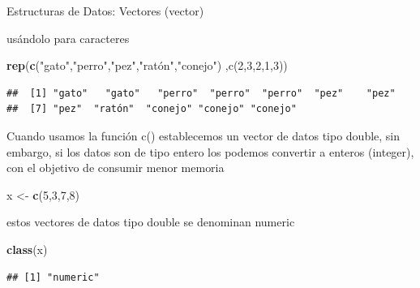 \documentclass[ignorenonframetext,]{beamer}
\newenvironment{Shaded}{\begin{snugshade}}{\end{snugshade}}
\newcommand{\KeywordTok}[1]{\textcolor[rgb]{0.13,0.29,0.53}{\textbf{#1}}}
\newcommand{\DecValTok}[1]{\textcolor[rgb]{0.00,0.00,0.81}{#1}}
\newcommand{\StringTok}[1]{\textcolor[rgb]{0.31,0.60,0.02}{#1}}
\newcommand{\NormalTok}[1]{#1}
\begin{document}
\begin{frame}[fragile]{Estructuras de Datos: Vectores (vector)}

usándolo para caracteres

\begin{Shaded}
\begin{Highlighting}[]
\KeywordTok{rep}\NormalTok{(}\KeywordTok{c}\NormalTok{(}\StringTok{"gato"}\NormalTok{,}\StringTok{"perro"}\NormalTok{,}\StringTok{"pez"}\NormalTok{,}\StringTok{"ratón","}\NormalTok{conejo}\StringTok{")}
\StringTok{    ,c(2,3,2,1,3))}
\end{Highlighting}
\end{Shaded}

\begin{verbatim}
##  [1] "gato"   "gato"   "perro"  "perro"  "perro"  "pez"    "pez"   
##  [7] "pez"  "ratón"  "conejo" "conejo" "conejo"
\end{verbatim}

Cuando usamos la función c() establecemos un vector de datos tipo
double, sin embargo, si los datos son de tipo entero los podemos
convertir a enteros (integer), con el objetivo de consumir menor memoria

\begin{Shaded}
\begin{Highlighting}[]
\NormalTok{x <-}\StringTok{ }\KeywordTok{c}\NormalTok{(}\DecValTok{5}\NormalTok{,}\DecValTok{3}\NormalTok{,}\DecValTok{7}\NormalTok{,}\DecValTok{8}\NormalTok{)}
\end{Highlighting}
\end{Shaded}

estos vectores de datos tipo double se denominan numeric

\begin{Shaded}
\begin{Highlighting}[]
\KeywordTok{class}\NormalTok{(x)}
\end{Highlighting}
\end{Shaded}

\begin{verbatim}
## [1] "numeric"
\end{verbatim}

\end{frame}
\end{document}
